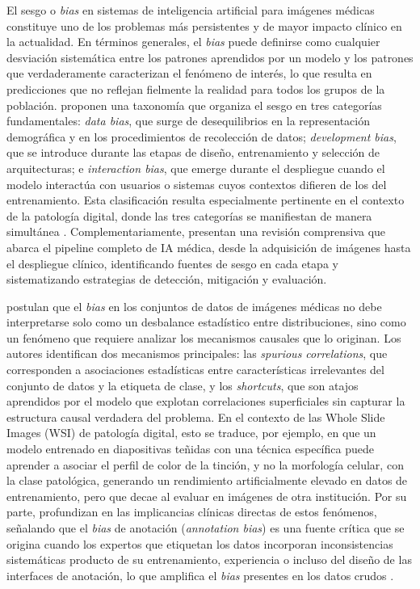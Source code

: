 El sesgo o \textit{bias} en sistemas de inteligencia artificial para imágenes médicas constituye uno de los problemas más persistentes y de mayor impacto clínico en la actualidad. 
En términos generales, el \textit{bias} puede definirse como cualquier desviación sistemática entre los patrones aprendidos por un modelo y los patrones que verdaderamente caracterizan el 
fenómeno de interés, lo que resulta en predicciones que no reflejan fielmente la realidad para todos los grupos de la población. \citeauthor{hanna2024} proponen una taxonomía
 que organiza el sesgo en tres categorías fundamentales: \textit{data bias}, que surge de desequilibrios en la representación demográfica y en los procedimientos de recolección de 
 datos; \textit{development bias}, que se introduce durante las etapas de diseño, entrenamiento y selección de arquitecturas; e \textit{interaction bias}, que emerge durante el 
 despliegue cuando el modelo interactúa con usuarios o sistemas cuyos contextos difieren de los del entrenamiento. Esta clasificación resulta especialmente pertinente 
 en el contexto de la patología digital, donde las tres categorías se manifiestan de manera simultánea \citep{hanna2024}. Complementariamente, \citeauthor{ponsiglione2024} presentan 
 una revisión comprensiva que abarca el pipeline completo de IA médica, desde la adquisición de imágenes hasta el despliegue clínico, identificando fuentes de sesgo en cada etapa y 
 sistematizando estrategias de detección, mitigación y evaluación.

\citeauthor{jones2024causal} postulan que el \textit{bias} en los conjuntos de datos de imágenes médicas no debe interpretarse solo como un desbalance estadístico entre distribuciones, 
sino como un fenómeno que requiere analizar los mecanismos causales que lo originan. Los autores identifican dos mecanismos principales: las \textit{spurious correlations}, que 
corresponden a asociaciones estadísticas entre características irrelevantes del conjunto de datos y la etiqueta de clase, y los \textit{shortcuts}, que son atajos aprendidos por el modelo que 
explotan correlaciones superficiales sin capturar la estructura causal verdadera del problema. En el contexto de las Whole Slide Images (WSI) de patología digital, 
esto se traduce, por ejemplo, en que un modelo entrenado en diapositivas teñidas con una técnica específica puede aprender a asociar el perfil de color de la tinción, y no la morfología
 celular, con la clase patológica, generando un rendimiento artificialmente elevado en datos de entrenamiento, pero que decae al evaluar en imágenes de otra institución. Por su parte, 
 \citeauthor{onofrey2024} profundizan en las implicancias clínicas directas de estos fenómenos, señalando que el \textit{bias} de anotación (\textit{annotation bias}) es una fuente crítica que 
 se origina cuando los expertos que etiquetan los datos incorporan inconsistencias sistemáticas producto de su entrenamiento, experiencia o incluso del diseño de las interfaces de 
 anotación, lo que amplifica el \textit{bias} presentes en los datos crudos \citep{onofrey2024}.

